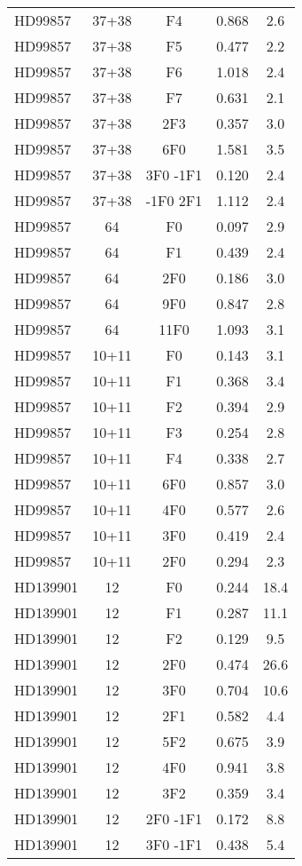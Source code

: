 \begin{table*}
\begin{tabular}{l c c c c}
HD99857 & 37+38 & F4 & 0.868 & 2.6\\ 
HD99857 & 37+38 & F5 & 0.477 & 2.2\\ 
HD99857 & 37+38 & F6 & 1.018 & 2.4\\ 
HD99857 & 37+38 & F7 & 0.631 & 2.1\\ 
HD99857 & 37+38 & 2F3 & 0.357 & 3.0\\ 
HD99857 & 37+38 & 6F0 & 1.581 & 3.5\\ 
HD99857 & 37+38 & 3F0 -1F1 & 0.120 & 2.4\\ 
HD99857 & 37+38 & -1F0 2F1 & 1.112 & 2.4\\ 
\hline
HD99857 & 64 & F0 & 0.097 & 2.9\\ 
HD99857 & 64 & F1 & 0.439 & 2.4\\ 
HD99857 & 64 & 2F0 & 0.186 & 3.0\\ 
HD99857 & 64 & 9F0 & 0.847 & 2.8\\ 
HD99857 & 64 & 11F0 & 1.093 & 3.1\\ 
\hline
HD99857 & 10+11 & F0 & 0.143 & 3.1\\ 
HD99857 & 10+11 & F1 & 0.368 & 3.4\\ 
HD99857 & 10+11 & F2 & 0.394 & 2.9\\ 
HD99857 & 10+11 & F3 & 0.254 & 2.8\\ 
HD99857 & 10+11 & F4 & 0.338 & 2.7\\ 
HD99857 & 10+11 & 6F0 & 0.857 & 3.0\\ 
HD99857 & 10+11 & 4F0 & 0.577 & 2.6\\ 
HD99857 & 10+11 & 3F0 & 0.419 & 2.4\\ 
HD99857 & 10+11 & 2F0 & 0.294 & 2.3\\ 
\hline
HD139901 & 12 & F0 & 0.244 & 18.4\\ 
HD139901 & 12 & F1 & 0.287 & 11.1\\ 
HD139901 & 12 & F2 & 0.129 & 9.5\\ 
HD139901 & 12 & 2F0 & 0.474 & 26.6\\ 
HD139901 & 12 & 3F0 & 0.704 & 10.6\\ 
HD139901 & 12 & 2F1 & 0.582 & 4.4\\ 
HD139901 & 12 & 5F2 & 0.675 & 3.9\\ 
HD139901 & 12 & 4F0 & 0.941 & 3.8\\ 
HD139901 & 12 & 3F2 & 0.359 & 3.4\\ 
HD139901 & 12 & 2F0 -1F1 & 0.172 & 8.8\\ 
HD139901 & 12 & 3F0 -1F1 & 0.438 & 5.4\\ 

\end{tabular}
\end{table*}

